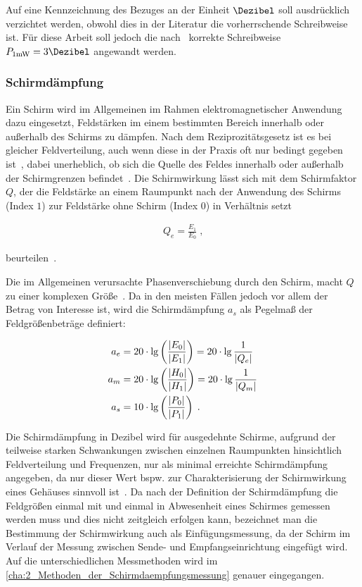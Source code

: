 Auf eine Kennzeichnung des Bezuges an der Einheit $\si{\Dezibel}$ soll ausdrücklich verzichtet werden, obwohl dies in der Literatur die vorherrschende Schreibweise ist. Für diese Arbeit soll jedoch die nach~\cite{IEC60027-3} korrekte Schreibweise $P_{1 \si{\milli\watt}} = 3 \si{\Dezibel}$ angewandt werden. 


\subsubsection{Schirmdämpfung}\label{cha:2_subsub_Schirmdaempfung}

Ein Schirm wird im Allgemeinen im Rahmen elektromagnetischer Anwendung dazu eingesetzt, Feldstärken im einem bestimmten Bereich innerhalb oder außerhalb des Schirms zu dämpfen. Nach dem Reziprozitätsgesetz ist es bei gleicher Feldverteilung, auch wenn diese in der Praxis oft nur bedingt gegeben ist~\cite{EMV-gerechtes_Geraetedesign}, dabei unerheblich, ob sich die Quelle des Feldes innerhalb oder außerhalb der Schirmgrenzen befindet~\cite{EM_Schirmung}. Die Schirmwirkung lässt sich mit dem Schirmfaktor $Q$, der die Feldstärke an einem Raumpunkt nach der Anwendung des Schirms (Index \glqq$1$\grqq) zur Feldstärke ohne Schirm (Index \glqq$0$\grqq) in Verhältnis setzt

\begin{align}
    Q_e = \frac{E_1}{E_0} \; \text{,}
\end{align}

beurteilen~\cite{EM_Schirmung}.
\par
\vspace{\linespace}
Die im Allgemeinen verursachte Phasenverschiebung durch den Schirm, macht $Q$ zu einer komplexen Größe~\cite{EM_Schirmung}. Da in den meisten Fällen jedoch vor allem der Betrag von Interesse ist, wird die Schirmdämpfung $a_s$ als Pegelmaß der Feldgrößenbeträge definiert:

\begin{align}
    a_e &= 20 \cdot \lg \left(\frac{\lvert E_0\rvert}{\lvert E_1\rvert}\right) = 20 \cdot \lg \frac{1}{\lvert Q_e\rvert} \\
    a_m &= 20 \cdot \lg \left(\frac{\lvert H_0\rvert}{\lvert H_1\rvert}\right) = 20 \cdot \lg \frac{1}{\lvert Q_m\rvert} \\
    a_s &= 10 \cdot \lg \left(\frac{\lvert P_0\rvert}{\lvert P_1\rvert}\right) \; \text{.}
\end{align}

Die Schirmdämpfung in Dezibel wird für ausgedehnte Schirme, aufgrund der teilweise starken Schwankungen zwischen einzelnen Raumpunkten hinsichtlich Feldverteilung und Frequenzen, nur als minimal erreichte Schirmdämpfung angegeben, da nur dieser Wert bspw. zur Charakterisierung der Schirmwirkung eines Gehäuses sinnvoll ist~\cite{EM_Schirmung}. Da nach der Definition der Schirmdämpfung die Feldgrößen einmal mit und einmal in Abwesenheit eines Schirmes gemessen werden muss und dies nicht zeitgleich erfolgen kann, bezeichnet man die Bestimmung der Schirmwirkung auch als Einfügungsmessung, da der Schirm im Verlauf der Messung zwischen Sende- und Empfangseinrichtung eingefügt wird. Auf die unterschiedlichen Messmethoden wird im \Abschnitt\ref{cha:2_Methoden_der_Schirmdaempfungsmessung} genauer eingegangen.


